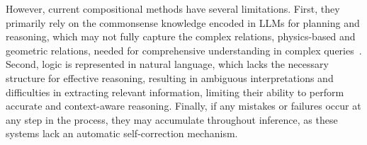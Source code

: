 However, current compositional methods have several limitations.
First, they primarily rely on the commonsense knowledge encoded in LLMs for planning and reasoning, which may not fully capture the complex relations, \eg physics-based and geometric relations, needed for comprehensive understanding in complex queries~\cite{chen_spatialvlm_2024}.
Second, logic is represented in natural language, which lacks the necessary structure for effective reasoning, resulting in ambiguous interpretations and difficulties in extracting relevant information, limiting their ability to perform accurate and context-aware reasoning. 
Finally, if any mistakes or failures occur at any step in the process, they may accumulate throughout inference, as these systems lack an automatic self-correction mechanism.

